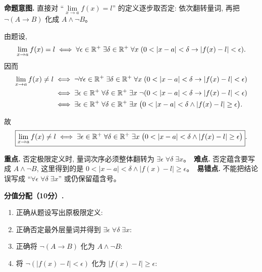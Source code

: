 \documentclass[a4paper, justified]{tufte-handout}
\newenvironment{intention}
  {\par\smallskip\noindent\textbf{命题意图. }\ignorespaces}
  {\par\smallskip}
\begin{document}
\begin{solution}
  \begin{intention}
    直接对 ``$\lim\limits_{x \to a} f(x) = l$'' 的定义逐步取否定: 依次翻转量词, 再把 $\lnot(A \to B)$ 化成 $A \land \lnot B$。
  \end{intention}

  由题设,
  \[
    \lim\limits_{x \to a} f(x) = l
    \iff
    \forall \epsilon \in \mathbb{R}^{+}\; \exists \delta \in \mathbb{R}^{+}\;
      \forall x\; (0 < |x - a| < \delta \to |f(x) - l| < \epsilon).
  \]
  因而
  \begin{align*}
    \lim\limits_{x \to a} f(x) \neq l
      &\iff \lnot \forall \epsilon \in \mathbb{R}^{+}\; \exists \delta \in \mathbb{R}^{+}\;
        \forall x\; (0 < |x - a| < \delta \to |f(x) - l| < \epsilon) \\
      &\iff \exists \epsilon \in \mathbb{R}^{+}\; \forall \delta \in \mathbb{R}^{+}\;
        \exists x\; \lnot (0 < |x - a| < \delta \to |f(x) - l| < \epsilon) \\
      &\iff \exists \epsilon \in \mathbb{R}^{+}\; \forall \delta \in \mathbb{R}^{+}\;
        \exists x\; \big(0 < |x - a| < \delta \land |f(x) - l| \ge \epsilon\big).
  \end{align*}

  故
  \[
    \boxed{
      \lim\limits_{x \to a} f(x) \neq l
      \iff
      \exists \epsilon \in \mathbb{R}^{+}\; \forall \delta \in \mathbb{R}^{+}\;
        \exists x\; \big(0 < |x - a| < \delta \land |f(x) - l| \ge \epsilon\big)
    }.
  \]

  \begin{remark}
    \textbf{重点.} 否定极限定义时, 量词次序必须整体翻转为 $\exists \epsilon\; \forall \delta\; \exists x$。\
    \textbf{难点.} 否定蕴含要写成 $A \land \lnot B$, 这里得到的是
    $0 < |x-a| < \delta \land |f(x)-l| \ge \epsilon$。\
    \textbf{易错点.} 不能把结论误写成 ``$\forall \epsilon\; \forall \delta\; \exists x$'' 或仍保留蕴含号。
  \end{remark}

  \textbf{分值分配（10分）.}
  \begin{enumerate}[(1)]
    \item 正确从题设写出原极限定义: 
    \item 正确否定最外层量词并得到 $\exists \epsilon\; \forall \delta\; \exists x$: 
    \item 正确将 $\lnot(A \to B)$ 化为 $A \land \lnot B$: 
    \item 将 $\lnot(|f(x)-l| < \epsilon)$ 化为 $|f(x)-l| \ge \epsilon$: \score{1}
  \end{enumerate}
\end{solution}
\end{document}

